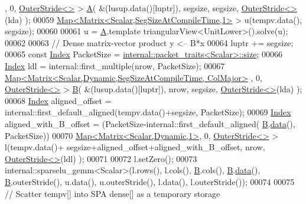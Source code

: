 \begin{DoxyCode}
      , 0, \hyperlink{class_eigen_1_1_outer_stride}{OuterStride<>} > \hyperlink{group___core___module_class_eigen_1_1_matrix}{A}( &(lusup.data()[luptr]), segsize, segsize, 
      \hyperlink{class_eigen_1_1_outer_stride}{OuterStride<>}(lda) );
00059   \hyperlink{group___core___module_class_eigen_1_1_map}{Map<Matrix<Scalar,SegSizeAtCompileTime,1>} > u(tempv.data(), 
      segsize);
00060   
00061   u = \hyperlink{group___core___module_class_eigen_1_1_matrix}{A}.template triangularView<UnitLower>().solve(u); 
00062   
00063   \textcolor{comment}{// Dense matrix-vector product y <-- B*x }
00064   luptr += segsize;
00065   \textcolor{keyword}{const} \hyperlink{namespace_eigen_a62e77e0933482dafde8fe197d9a2cfde}{Index} PacketSize = \hyperlink{struct_eigen_1_1internal_1_1packet__traits}{internal::packet\_traits<Scalar>::size};
00066   \hyperlink{namespace_eigen_a62e77e0933482dafde8fe197d9a2cfde}{Index} ldl = internal::first\_multiple(nrow, PacketSize);
00067   \hyperlink{group___core___module_class_eigen_1_1_map}{Map<Matrix<Scalar,Dynamic,SegSizeAtCompileTime, ColMajor>}
      , 0, \hyperlink{class_eigen_1_1_outer_stride}{OuterStride<>} > \hyperlink{group___core___module_class_eigen_1_1_matrix}{B}( &(lusup.data()[luptr]), nrow, segsize, 
      \hyperlink{class_eigen_1_1_outer_stride}{OuterStride<>}(lda) );
00068   \hyperlink{namespace_eigen_a62e77e0933482dafde8fe197d9a2cfde}{Index} aligned\_offset = internal::first\_default\_aligned(tempv.data()+segsize, PacketSize);
00069   \hyperlink{namespace_eigen_a62e77e0933482dafde8fe197d9a2cfde}{Index} aligned\_with\_B\_offset = (PacketSize-internal::first\_default\_aligned(
      \hyperlink{group___core___module_class_eigen_1_1_matrix}{B}.\hyperlink{class_eigen_1_1_plain_object_base_ac25699535374b1854cf8494e44ad31b2}{data}(), PacketSize))%
00070   \hyperlink{group___core___module_class_eigen_1_1_map}{Map<Matrix<Scalar,Dynamic,1>}, 0, \hyperlink{class_eigen_1_1_outer_stride}{OuterStride<>} > l(tempv.data()+
      segsize+aligned\_offset+aligned\_with\_B\_offset, nrow, \hyperlink{class_eigen_1_1_outer_stride}{OuterStride<>}(ldl) );
00071   
00072   l.setZero();
00073   internal::sparselu\_gemm<Scalar>(l.rows(), l.cols(), \hyperlink{group___core___module_class_eigen_1_1_matrix}{B}.cols(), \hyperlink{group___core___module_class_eigen_1_1_matrix}{B}.\hyperlink{class_eigen_1_1_plain_object_base_ac25699535374b1854cf8494e44ad31b2}{data}(), 
      \hyperlink{group___core___module_class_eigen_1_1_matrix}{B}.outerStride(), u.data(), u.outerStride(), l.data(), l.outerStride());
00074   
00075   \textcolor{comment}{// Scatter tempv[] into SPA dense[] as a temporary storage }

\end{DoxyCode}

